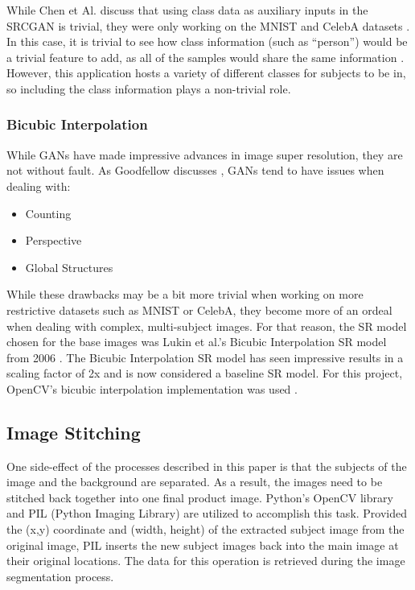 While Chen et Al. discuss that using class data as auxiliary inputs in the
SRCGAN is trivial, they were only working on the MNIST and CelebA datasets
\cite{Chen}. In this case, it is trivial to see how class information (such as
“person”) would be a trivial feature to add, as all of the samples would share
the same information \cite{Chen}. However, this application hosts a variety of
different classes for subjects to be in, so including the class information
plays a non-trivial role. \\

\subsubsection{Bicubic Interpolation}
While GANs have made impressive advances in image super resolution, they are not
without fault. As Goodfellow discusses \cite{Goodfellow2017}, GANs tend to have
issues when dealing with:

\begin{itemize}
	\item Counting
	\item Perspective
	\item Global Structures
\end{itemize}

While these drawbacks may be a bit more trivial when working on more restrictive
datasets such as MNIST or CelebA, they become more of an ordeal when dealing
with complex, multi-subject images. For that reason, the SR model chosen for the
base images was Lukin et al.’s Bicubic Interpolation SR model from 2006
\cite{Lukin2006}. The Bicubic Interpolation SR model has seen impressive results in a scaling
factor of 2x and is now considered a baseline SR model. For this project,
OpenCV’s bicubic interpolation implementation was used \cite{Bradski2000}.

\subsection{Image Stitching}
One side-effect of the processes described in this paper is that the subjects of
the image and the background are separated. As a result, the images need to be
stitched back together into one final product image. Python’s OpenCV library and
PIL (Python Imaging Library) are utilized to accomplish this task. Provided the
(x,y) coordinate and (width, height) of the extracted subject image from the
original image, PIL inserts the new subject images back into the main image at
their original locations. The data for this operation is retrieved during the
image segmentation process.

